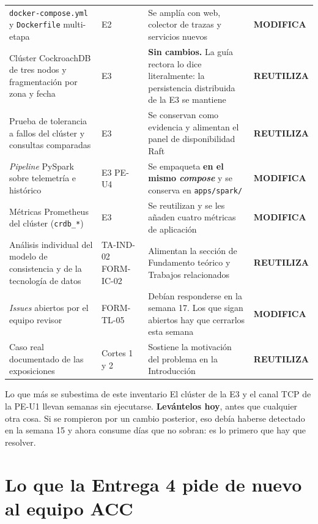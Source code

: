 \documentclass[11pt,a4paper]{article}
\newcommand{\reuso}{\cellcolor{filaReuso}\textbf{REUTILIZA}}
\newcommand{\cambia}{\cellcolor{filaCambia}\textbf{MODIFICA}}
\begin{document}
\begin{center}
\begin{longtable}{@{}p{3.7cm}p{1.5cm}p{5.2cm}p{4.4cm}@{}}
		\addlinespace
		\texttt{docker-compose.yml} y \texttt{Dockerfile} multi-etapa & E2 & Se amplía con web, colector de trazas y servicios nuevos & \cambia \\
		\addlinespace
		Clúster CockroachDB de tres nodos y fragmentación por zona y fecha & E3 & \textbf{Sin cambios.} La guía rectora lo dice literalmente: la persistencia distribuida de la E3 se mantiene & \reuso \\
		\addlinespace
		Prueba de tolerancia a fallos del clúster y consultas comparadas & E3 & Se conservan como evidencia y alimentan el panel de disponibilidad Raft & \reuso \\
		\addlinespace
		\emph{Pipeline} PySpark sobre telemetría e histórico & E3 \newline PE-U4 & Se empaqueta \textbf{en el mismo \emph{compose}} y se conserva en \texttt{apps/spark/} & \cambia \\
		\addlinespace
		Métricas Prometheus del clúster (\texttt{crdb\_*}) & E3 & Se reutilizan y se les añaden cuatro métricas de aplicación & \cambia \\
		\addlinespace
		Análisis individual del modelo de consistencia y de la tecnología de datos & TA-IND-02 \newline FORM-IC-02 & Alimentan la sección de Fundamento teórico y Trabajos relacionados & \reuso \\
		\addlinespace
		\emph{Issues} abiertos por el equipo revisor & FORM-TL-05 & Debían responderse en la semana 17. Los que sigan abiertos hay que cerrarlos esta semana & \cambia \\
		\addlinespace
		Caso real documentado de las exposiciones & Cortes 1 y 2 & Sostiene la motivación del problema en la Introducción & \reuso \\
		\bottomrule
	\end{longtable}
\end{center}

\begin{avisoBox}{Lo que más se subestima de este inventario}
	El clúster de la E3 y el canal TCP de la PE-U1 llevan semanas sin ejecutarse. \textbf{Levántelos hoy}, antes que cualquier otra cosa. Si se rompieron por un cambio posterior, eso debía haberse detectado en la semana 15 y ahora consume días que no sobran: es lo primero que hay que resolver.
\end{avisoBox}

\section{Lo que la Entrega 4 pide de nuevo al equipo ACC}
\end{document}
